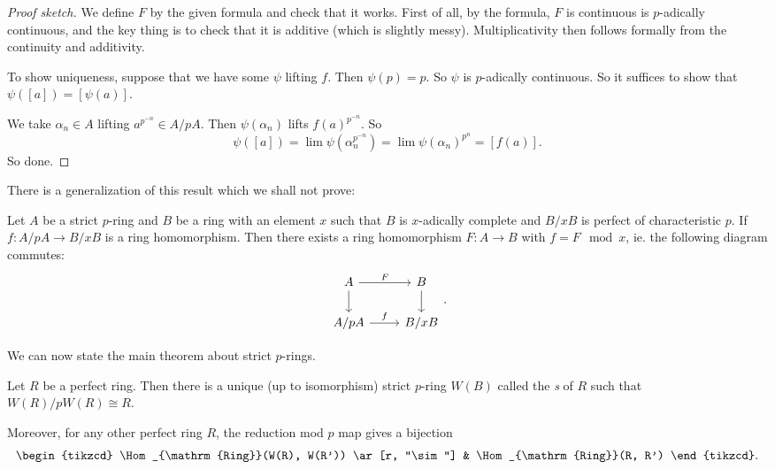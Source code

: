 \documentclass[a4paper]{article}
\begin{document}
\begin{proof}[Proof sketch]
  We define $F$ by the given formula and check that it works. First of all, by the formula, $F$ is continuous is $p$-adically continuous, and the key thing is to check that it is additive (which is slightly messy). Multiplicativity then follows formally from the continuity and additivity.

  To show uniqueness, suppose that we have some $\psi$ lifting $f$. Then $\psi(p) = p$. So $\psi$ is $p$-adically continuous. So it suffices to show that $\psi([a]) = [\psi(a)]$.

  We take $\alpha_n \in A$ lifting $a^{p^{-n}} \in A/pA$. Then $\psi(\alpha_n)$ lifts $f(a)^{p^{-n}}$. So
  \[
    \psi([a]) = \lim \psi(\alpha_n^{p^{-n}}) = \lim \psi(\alpha_n)^{p^n} = [f(a)].
  \]
  So done.
\end{proof}

There is a generalization of this result which we shall not prove:
\begin{prop}
  Let $A$ be a strict $p$-ring and $B$ be a ring with an element $x$ such that $B$ is $x$-adically complete and $B/xB$ is perfect of characteristic $p$. If $f: A/pA \to B/xB$ is a ring homomorphism. Then there exists a ring homomorphism $F: A \to B$ with $f = F \mod x$, ie. the following diagram commutes:
  \[
    \begin{tikzcd}
      A \ar[r, "F"] \ar[d] & B \ar[d]\\
      A/pA \ar[r, "f"] & B/xB
    \end{tikzcd}.
  \]
\end{prop}

We can now state the main theorem about strict $p$-rings.

\begin{thm}
  Let $R$ be a perfect ring. Then there is a unique (up to isomorphism) strict $p$-ring $W(B)$ called the \emph{s} of $R$ such that $W(R)/p W(R) \cong R$.

  Moreover, for any other perfect ring $R$, the reduction mod $p$ map gives a bijection
  \[
    \begin{tikzcd}
      \Hom_{\mathrm{Ring}}(W(R), W(R')) \ar[r, "\sim"] & \Hom_{\mathrm{Ring}}(R, R')
    \end{tikzcd}.
  \]
\end{thm}
\end{document}
